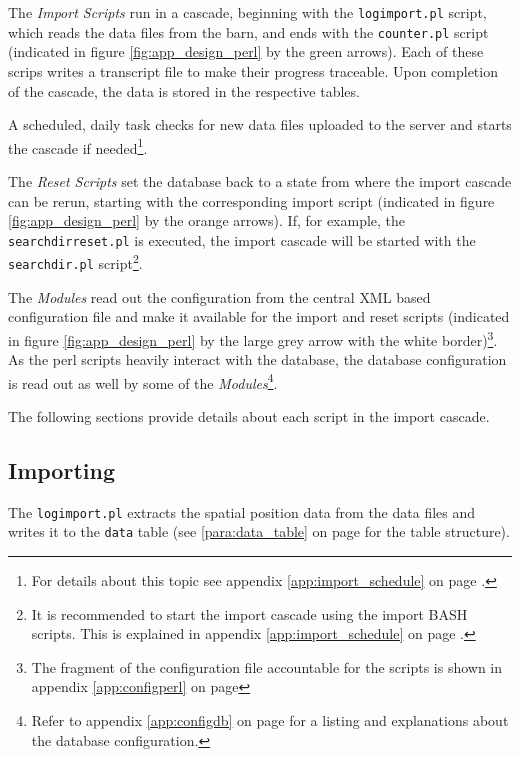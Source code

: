 The \textit{Import Scripts} run in a cascade, beginning with the \lstinline|logimport.pl| script, which reads the data files from the barn, and ends with the \lstinline|counter.pl| script (indicated in figure \ref{fig:app_design_perl} by the green arrows). Each of these scrips writes a transcript file to make their progress traceable. Upon completion of the cascade, the data is stored in the respective tables.

A scheduled, daily task checks for new data files uploaded to the server and starts the cascade if needed\footnote{For details about this topic see appendix \ref{app:import_schedule} on page \pageref{app:import_schedule}.}.

The \textit{Reset Scripts} set the database back to a state from where the import cascade can be rerun, starting with the corresponding import script (indicated in figure \ref{fig:app_design_perl} by the orange arrows). If, for example, the \lstinline|searchdirreset.pl| is executed, the import cascade will be started with the \lstinline|searchdir.pl| script\footnote{It is recommended to start the import cascade using the import BASH scripts. This is explained in appendix \ref{app:import_schedule} on page \pageref{app:import_schedule}.}.

The \textit{Modules} read out the configuration from the central \ac{XML} based configuration file and make it available for the import and reset scripts (indicated in figure \ref{fig:app_design_perl} by the large grey arrow with the white border)\footnote{The fragment of the configuration file accountable for the scripts is shown in appendix \ref{app:configperl} on page \pageref{app:configperl}}. As the perl scripts heavily interact with the database, the database configuration is read out as well by some of the \textit{Modules}\footnote{Refer to appendix \ref{app:configdb} on page \pageref{app:configdb} for a listing and explanations about the database configuration.}. 

The following sections provide details about each script in the import cascade.

\subsection{Importing}
\label{subsec:importing}

The \lstinline|logimport.pl| extracts the spatial position data from the data files and writes it to the \lstinline|data| table (see \ref{para:data_table} on page \pageref{para:data_table} for the table structure).

